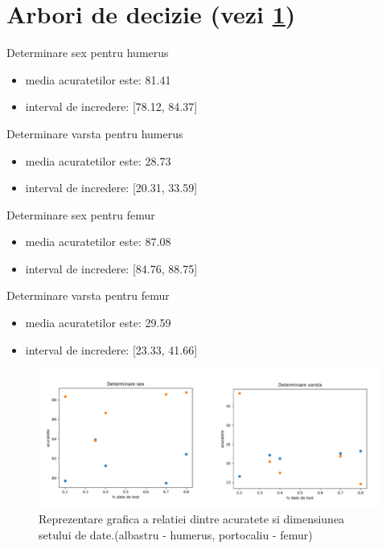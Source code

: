 \documentclass[runningheads,a4paper,11pt]{report}
\begin{document}
\section{Arbori de decizie (vezi \ref{plot_arbori})} 
\label{analizaArboriSex}
Determinare sex pentru humerus
\begin{itemize}
    \item media acuratetilor este: 81.41
    \item interval de incredere: [78.12, 84.37]
\end{itemize}

\noindent Determinare varsta pentru humerus
\begin{itemize}
    \item media acuratetilor este: 28.73
    \item interval de incredere: [20.31, 33.59]
\end{itemize}

\noindent Determinare sex pentru femur
\begin{itemize}
    \item media acuratetilor este: 87.08
    \item interval de incredere: [84.76, 88.75]
\end{itemize}

\noindent Determinare varsta pentru femur
\begin{itemize}
    \item media acuratetilor este: 29.59
    \item interval de incredere: [23.33, 41.66]
\end{itemize}

\begin{figure}
    \centering
    \includegraphics[width=18cm]{Imagini/plot_acc_arbori.PNG}
    \caption{Reprezentare grafica a relatiei dintre acuratete si dimensiunea setului de date.\newline (albastru - humerus, portocaliu - femur)}
    \label{plot_arbori}
\end{figure}
\end{document}

